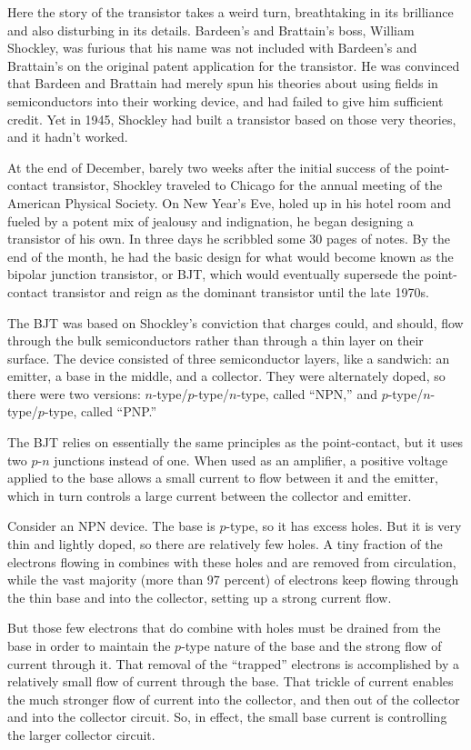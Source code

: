\documentclass[12pt]{article}
\begin{document}
Here the story of the transistor takes a weird turn, breathtaking in its brilliance and also disturbing in its details. Bardeen’s and Brattain’s boss, William Shockley, was furious that his name was not included with Bardeen’s and Brattain’s on the original patent application for the transistor. He was convinced that Bardeen and Brattain had merely spun his theories about using fields in semiconductors into their working device, and had failed to give him sufficient credit. Yet in 1945, Shockley had built a transistor based on those very theories, and it hadn’t worked.

At the end of December, barely two weeks after the initial success of the point-contact transistor, Shockley traveled to Chicago for the annual meeting of the American Physical Society. On New Year’s Eve, holed up in his hotel room and fueled by a potent mix of jealousy and indignation, he began designing a transistor of his own. In three days he scribbled some 30 pages of notes. By the end of the month, he had the basic design for what would become known as the bipolar junction transistor, or BJT, which would eventually supersede the point-contact transistor and reign as the dominant transistor until the late 1970s.

The BJT was based on Shockley’s conviction that charges could, and should, flow through the bulk semiconductors rather than through a thin layer on their surface. The device consisted of three semiconductor layers, like a sandwich: an emitter, a base in the middle, and a collector. They were alternately doped, so there were two versions: $n$-type/$p$-type/$n$-type, called ``NPN,'' and $p$-type/$n$-type/$p$-type, called ``PNP.''

The BJT relies on essentially the same principles as the point-contact, but it uses two $p$-$n$ junctions instead of one. When used as an amplifier, a positive voltage applied to the base allows a small current to flow between it and the emitter, which in turn controls a large current between the collector and emitter.

Consider an NPN device. The base is $p$-type, so it has excess holes. But it is very thin and lightly doped, so there are relatively few holes. A tiny fraction of the electrons flowing in combines with these holes and are removed from circulation, while the vast majority (more than 97 percent) of electrons keep flowing through the thin base and into the collector, setting up a strong current flow.

But those few electrons that do combine with holes must be drained from the base in order to maintain the $p$-type nature of the base and the strong flow of current through it. That removal of the ``trapped'' electrons is accomplished by a relatively small flow of current through the base. That trickle of current enables the much stronger flow of current into the collector, and then out of the collector and into the collector circuit. So, in effect, the small base current is controlling the larger collector circuit.
\end{document}
